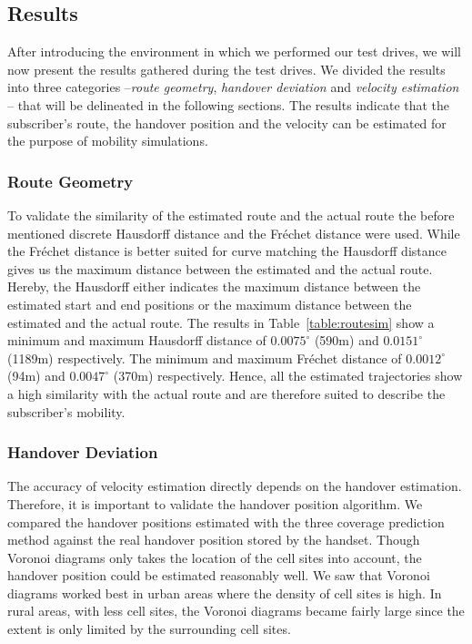 \documentclass[twocolumn]{bmcart}%
\begin{document}
\subsection*{Results}
After introducing the environment in which we performed our test drives, we will now present the results gathered during the test drives. We divided the results into three categories --\emph{route geometry}, \emph{handover deviation} and \emph{velocity estimation} -- that will be delineated in the following sections. The results indicate that the subscriber's route, the handover position and the velocity can be estimated for the purpose of mobility simulations.
\subsubsection*{Route Geometry}
To validate the similarity of the estimated route and the actual route the before mentioned discrete Hausdorff distance and the Fr\'{e}chet distance were used. While the Fr\'{e}chet distance is better suited for curve matching the Hausdorff distance gives us the maximum distance between the estimated and the actual route. Hereby, the Hausdorff either indicates the maximum distance between the estimated start and end positions or the maximum distance between the estimated and the actual route. The results in Table~\ref{table:routesim} show a minimum and maximum Hausdorff distance of $0.0075^\circ$ (590m) and $0.0151^\circ$ (1189m) respectively. The minimum and maximum Fr\'{e}chet distance of $0.0012^\circ$ (94m) and $0.0047^\circ$ (370m) respectively. Hence, all the estimated trajectories show a high similarity with the actual route and are therefore suited to describe the subscriber's mobility.
\subsubsection*{Handover Deviation}
The accuracy of velocity estimation directly depends on the handover estimation. Therefore, it is important to validate the handover position algorithm. We compared the handover positions estimated with the three coverage prediction method against the real handover position stored by the handset. Though Voronoi diagrams only takes the location of the cell sites into account, the handover position could be estimated reasonably well. We saw that Voronoi diagrams worked best in urban areas where the density of cell sites is high. In rural areas, with less cell sites, the Voronoi diagrams became fairly large since the extent is only limited by the surrounding cell sites. 
\end{document}
